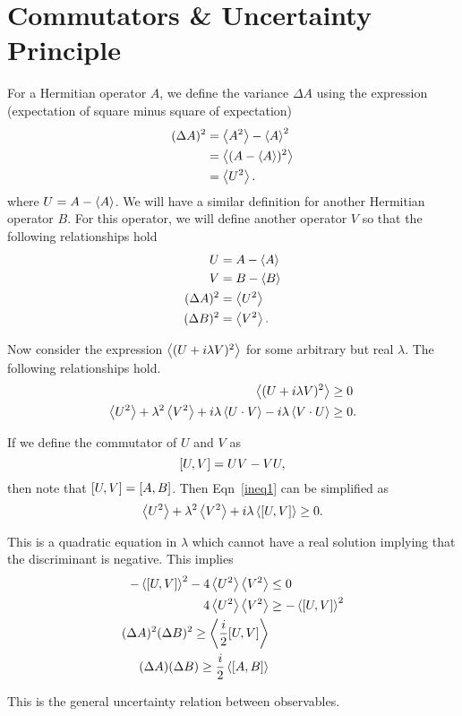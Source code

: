 \section{Commutators \&  Uncertainty Principle}{\label{subj:qm_sec:comm}}
For a Hermitian operator $A$, we define the variance $\Delta A$ using
the expression (expectation of square minus square of expectation)
\begin{equation*}
  \begin{split}
    (\Delta A)^2 & =  \expval{A^2} - \expval{A}^2 \\
                 & =  \expval{(A-\expval{A})^2} \\
                 & =  \expval{U^2}.
  \end{split}
\end{equation*}
where $U = A-\expval{A}$. We will have a similar definition for
another Hermitian operator $B$. For this operator, we will define
another operator $V$ so that the following relationships hold
\begin{equation*}
  \begin{split}
    U & = A - \expval{A} \\
    V & = B - \expval{B} \\
    (\Delta A)^2 & = \expval{U^2} \\
    (\Delta B)^2 & = \expval{V^2}.
  \end{split}
\end{equation*}

Now consider the expression $\expval{(U + i\lambda V)^2}$
for some arbitrary but real $\lambda$. The
following relationships hold.
\begin{equation}\label{ineq1}
\begin{split}
  \expval{(U + i\lambda V)^2} & \ge 0 \\
  \expval{U^2} + \lambda^2\expval{V^2} +
  i\lambda\expval{U\cdot V} - i\lambda\expval{V\cdot U} &
  \ge 0. 
\end{split}
\end{equation}

If we define the commutator of $U$ and $V$ as
\[
\commutator{U}{V} = UV - VU,
\]
then note that $\commutator{U}{V} = \commutator{A}{B}$. Then
Eqn~\ref{ineq1} can be simplified as
\begin{equation*}
  \expval{U^2} + \lambda^2\expval{V^2} + i\lambda\expval{\commutator{U}{V}} \ge 0.
\end{equation*}

This is a quadratic equation in $\lambda$ which cannot have a real
solution implying that the discriminant is negative. This implies
\begin{equation*}
  \begin{split}
    -\expval{\commutator{U}{V}}^2 -4\expval{U^2}\expval{V^2} & \le 0 \\
    4\expval{U^2}\expval{V^2} & \ge -\expval{\commutator{U}{V}}^2 \\
    (\Delta A)^2(\Delta B)^2 \ge \expval{\frac{i}{2}\commutator{U}{V}}
    \\
    (\Delta A)(\Delta B) \ge \frac{i}{2}\expval{\commutator{A}{B}}
  \end{split}
\end{equation*}

This is the general uncertainty relation between observables.
